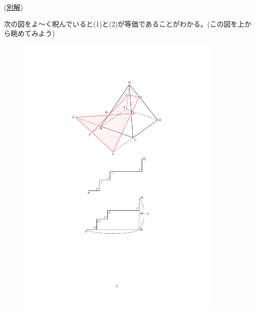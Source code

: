 \documentclass[a4paper,12pt,uplatex]{jsarticle}  %
\begin{document}
\begin{enumerate}
(\underline{別解})

次の図をよ〜く睨んでいると(1)と(2)が等価であることがわかる。(この図を上から眺めてみよう)
\begin{figure}[ht]
  \centering
  \includegraphics[width=10.0cm]{jizen_4_2_anothersolution.pdf}
\end{figure}


\end{enumerate}

\bigskip

\end{document}
